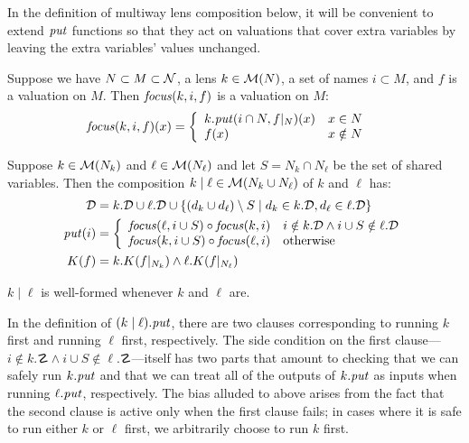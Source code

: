 In the definition of multiway lens composition below, it will be convenient
to extend $\mathit{put}$ functions so that they act on valuations that cover extra
variables by leaving the extra variables' values unchanged.
\begin{definition}
    Suppose we have $N \subset M \subset \mathcal N$, a lens $k \in \mathcal M(N)$,
    a set of names $i \subset M$, and $f$ is a valuation on $M$. Then
    $\mathit{focus}(k,i,f)$ is a valuation on $M$:
    \begin{align*}
        \mathit{focus}(k,i,f)(x) &= \left\{\begin{array}{ll}
            k.\mathit{put}(i \cap N,f|_N)(x) & x \in N \\
            f(x) & x \notin N
        \end{array}\right.
    \end{align*}
\end{definition}

\begin{definition}
    Suppose $k \in \mathcal M(N_k)$ and $\ell \in \mathcal M(N_\ell)$ and let $S =
    N_k \cap N_\ell$ be the set of shared variables. Then the composition
    $k\mid\ell \in \mathcal M(N_k \cup N_\ell)$ of $k$ and $\ell$ has:
    \begin{align*}
        \mathcal D &= k.\mathcal D \cup \ell.\mathcal D \cup
            \{(d_k \cup d_\ell) \setminus S
            \mid d_k \in k.\mathcal D, d_\ell \in \ell.\mathcal D\} \\
        \mathit{put}(i) &= \left\{\begin{array}{ll}
            \mathit{focus}(\ell,i\cup S) \circ \mathit{focus}(k,i)
                & i \notin k.\mathcal D \land i\cup S \notin \ell.\mathcal D \\
            \mathit{focus}(k,i\cup S) \circ \mathit{focus}(\ell,i)
                & \mbox{otherwise}
            \end{array}\right. \\
        K(f) &= k.K(f|_{N_k}) \land \ell.K(f|_{N_\ell})
    \end{align*}
\end{definition}

\begin{lemma}
    $k\mid\ell$ is well-formed whenever $k$ and $\ell$ are.
\end{lemma}

In the definition of $(k\mid\ell).\mathit{put}$, there are two clauses
corresponding to running $k$ first and running $\ell$ first, respectively.
The side condition on the first clause---$i \notin k.\danger \land i \cup S
\notin \ell.\danger$---itself has two parts that amount to
checking that we can safely run $k.\mathit{put}$ and that we can treat all of the
outputs of $k.\mathit{put}$ as inputs when running $\ell.\mathit{put}$, respectively. The
bias alluded to above arises from the fact that the second clause is active
only when the first clause fails; in cases where it is safe to run either
$k$ or $\ell$ first, we arbitrarily choose to run $k$ first.

